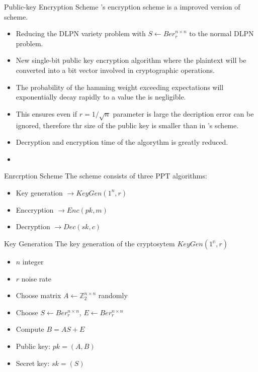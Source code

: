 \documentclass{beamer}
\begin{document}
\begin{frame}{Public-key Encryption Scheme}
  \cite{base}'s encryption scheme is a improved version of \cite{damgard} scheme.
  \begin{itemize}
    \item Reducing the DLPN variety problem with $ S \leftarrow \textit{Ber}_r^{n \times n} $ to the normal DLPN problem.
    \item New single-bit public key encryption algorithm where the plaintext will be converted into a bit vector involved in cryptographic operations.
    \item The probability of the hamming weight exceeding expectations will exponentially decay rapidly to a value the is negligible.
    \item This ensures even if $r = 1/\sqrt{n}$ parameter is large the decription error can be ignored, therefore thr size of the public key is smaller than in \cite{damgard}'s scheme.
    \item Decryption and encryption time of the algorythm is greatly reduced.
    \item
  \end{itemize}
\end{frame}

\begin{frame}{Enrcrption Scheme}
  The scheme consists of three PPT algorithms:
  \begin{itemize}
    \item Key generation  $\rightarrow KeyGen(1^{\textit{n}}, r) $
    \item Enccryption  $\rightarrow Enc(pk, m) $
    \item Decryption  $\rightarrow Dec(sk, c) $
  \end{itemize}
\end{frame}

\begin{frame}{Key Generation}
  The key generation of the cryptosytem $ KeyGen(1^\mathbb{n}, r) $
  \begin{itemize}
    \item $ n $ integer
    \item $r$ noise rate
    \item Choose matrix $ A \leftarrow \mathbb{Z}_2^{n \times n} $ randomly
    \item Choose $ S \leftarrow Ber_r^{n \times n} $, $ E \leftarrow Ber_r^{n \times n} $
    \item Compute $ B = AS + E $
    \item Public key: $ pk = (A,B) $
    \item Secret key: $ sk = (S) $
  \end{itemize}
\end{frame}
\end{document}

